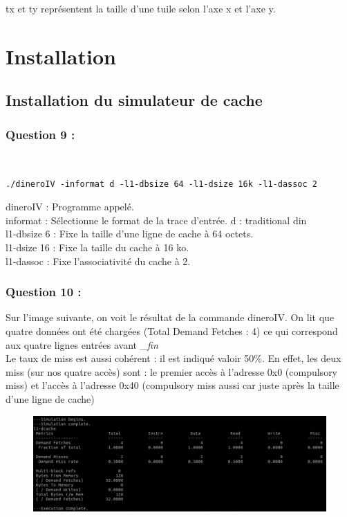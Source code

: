 \documentclass[11pt,a4paper]{article}
\begin{document}
tx et ty représentent la taille d'une tuile selon l'axe x et l'axe y. \\


\section{Installation}
\subsection{ Installation du simulateur de cache}
\subsubsection{Question 9 :}

~
\begin{verbatim}
./dineroIV -informat d -l1-dbsize 64 -l1-dsize 16k -l1-dassoc 2
\end{verbatim}
dineroIV : Programme appelé.\\
informat : Sélectionne le format de la trace d'entrée. d : traditional din\\
l1-dbsize 6 : Fixe la taille d'une ligne de cache à 64 octets.\\
l1-dsize 16 : Fixe la taille du cache à 16 ko.\\
l1-dassoc : Fixe l'associativité du cache à 2.\\



	\subsubsection{Question 10 :}

	Sur l'image suivante, on voit le résultat de la commande dineroIV. On lit
	que quatre données ont été chargées (Total Demand Fetches : 4) ce qui
	correspond aux quatre lignes entrées avant \textit{\_fin}\\
	Le taux de miss est aussi cohérent : il est indiqué valoir 50\%. En effet,
	les deux miss (sur nos quatre accès) sont : le premier accès à l'adresse 0x0
	(compulsory miss) et l'accès à l'adresse 0x40 (compulsory miss aussi car
	juste après la taille d'une ligne de cache)
\begin{figure}[h]
	\centering
	\includegraphics[scale=0.4]{../img/Q10_dineroIV_output.png}
\end{figure}
\end{document}
